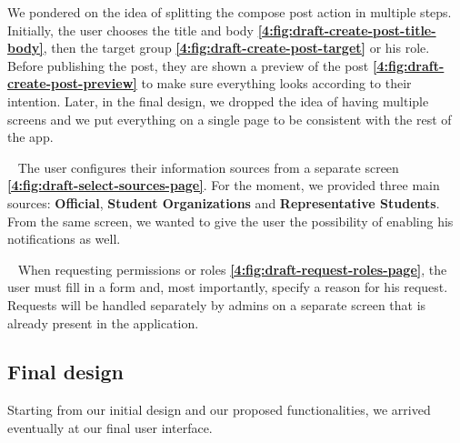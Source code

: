 We pondered on the idea of splitting the compose post action in multiple steps. Initially, the user chooses the title and body \textbf{\ref{4:fig:draft-create-post-title-body}}, then the target group \textbf{\ref{4:fig:draft-create-post-target}} or his role. Before publishing the post, they are shown a preview of the post \textbf{\ref{4:fig:draft-create-post-preview}} to make sure everything looks according to their intention. Later, in the final design, we dropped the idea of having multiple screens and we put everything on a single page to be consistent with the rest of the app.

~
The user configures their information sources from a separate screen \textbf{\ref{4:fig:draft-select-sources-page}}. For the moment, we provided three main sources: \textbf{Official}, \textbf{Student Organizations} and \textbf{Representative Students}. From the same screen, we wanted to give the user the possibility of enabling his notifications as well.

~
When requesting permissions or roles \textbf{\ref{4:fig:draft-request-roles-page}}, the user must fill in a form and, most importantly, specify a reason for his request. Requests will be handled separately by admins on a separate screen that is already present in the application.


\subsection{Final design} \label{4:final_design}

Starting from our initial design and our proposed functionalities, we arrived eventually at our final user interface.

